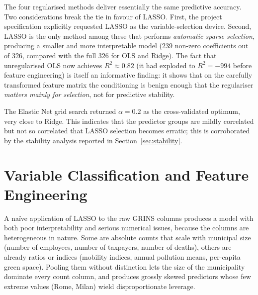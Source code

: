 \documentclass[11pt,a4paper]{article}
\begin{document}
The four regularised methods deliver essentially the same predictive
accuracy. Two considerations break the tie in favour of LASSO. First,
the project specification explicitly requested LASSO as the
variable-selection device. Second, LASSO is the only method among these
that performs \emph{automatic sparse selection}, producing a smaller and
more interpretable model (\(239\) non-zero coefficients out of \(326\),
compared with the full \(326\) for OLS and Ridge). The fact that
unregularised OLS now achieves \(R^{2}\approx 0.82\) (it had exploded
to \(R^{2} = -994\) before feature engineering) is itself an
informative finding: it shows that on the carefully transformed feature
matrix the conditioning is benign enough that the regulariser
\emph{matters mainly for selection}, not for predictive stability.

The Elastic Net grid search returned \(\alpha = 0.2\) as the
cross-validated optimum, very close to Ridge. This indicates that the
predictor groups are mildly correlated but not so correlated that LASSO
selection becomes erratic; this is corroborated by the stability
analysis reported in Section~\ref{sec:stability}.

\section{Variable Classification and Feature Engineering}
\label{sec:fe}

A naïve application of LASSO to the raw GRINS columns produces a model
with both poor interpretability and serious numerical issues, because
the columns are heterogeneous in nature. Some are absolute counts that
scale with municipal size (number of employees, number of taxpayers,
number of deaths), others are already ratios or indices (mobility
indices, annual pollution means, per-capita green space). Pooling them
without distinction lets the size of the municipality dominate every
count column, and produces grossly skewed predictors whose few
extreme values (Rome, Milan) wield disproportionate leverage.
\end{document}
